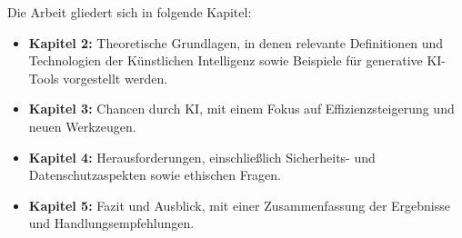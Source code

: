 Die Arbeit gliedert sich in folgende Kapitel:


\begin{itemize}
    \item \textbf{Kapitel 2:} Theoretische Grundlagen, in denen relevante Definitionen und Technologien der Künstlichen Intelligenz sowie Beispiele für generative KI-Tools vorgestellt werden.
    \item \textbf{Kapitel 3:} Chancen durch KI, mit einem Fokus auf Effizienzsteigerung und neuen Werkzeugen.
    \item \textbf{Kapitel 4:} Herausforderungen, einschließlich Sicherheits- und Datenschutzaspekten sowie ethischen Fragen.
    \item \textbf{Kapitel 5:} Fazit und Ausblick, mit einer Zusammenfassung der Ergebnisse und Handlungsempfehlungen.
\end{itemize}